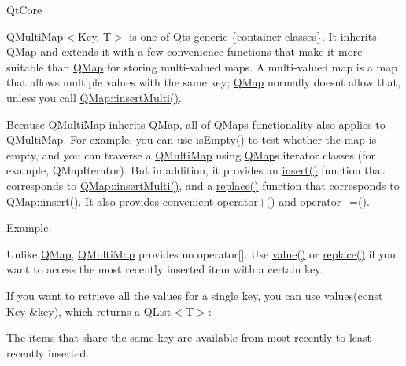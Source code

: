 Qt\+Core

\hyperlink{class_q_multi_map}{Q\+Multi\+Map}$<$Key, T$>$ is one of Qt\textquotesingle{}s generic \{container classes\}. It inherits \hyperlink{class_q_map}{Q\+Map} and extends it with a few convenience functions that make it more suitable than \hyperlink{class_q_map}{Q\+Map} for storing multi-\/valued maps. A multi-\/valued map is a map that allows multiple values with the same key; \hyperlink{class_q_map}{Q\+Map} normally doesn\textquotesingle{}t allow that, unless you call \hyperlink{class_q_map_a075634da2cf912a20dd1c4a5835acfa3}{Q\+Map\+::insert\+Multi()}.

Because \hyperlink{class_q_multi_map}{Q\+Multi\+Map} inherits \hyperlink{class_q_map}{Q\+Map}, all of \hyperlink{class_q_map}{Q\+Map}\textquotesingle{}s functionality also applies to \hyperlink{class_q_multi_map}{Q\+Multi\+Map}. For example, you can use \hyperlink{class_q_map_a33cfb24195273a5e70dcc48644368a99}{is\+Empty()} to test whether the map is empty, and you can traverse a \hyperlink{class_q_multi_map}{Q\+Multi\+Map} using \hyperlink{class_q_map}{Q\+Map}\textquotesingle{}s iterator classes (for example, Q\+Map\+Iterator). But in addition, it provides an \hyperlink{class_q_multi_map_ae067c2f922dd6e13001d93ace23a964a}{insert()} function that corresponds to \hyperlink{class_q_map_a075634da2cf912a20dd1c4a5835acfa3}{Q\+Map\+::insert\+Multi()}, and a \hyperlink{class_q_multi_map_a71c0ddeadd47b9410ef2d64c9fa24d72}{replace()} function that corresponds to \hyperlink{class_q_map_a0cc56ab47ea14af1127ac7399814d289}{Q\+Map\+::insert()}. It also provides convenient \hyperlink{class_q_multi_map_aef448db293ef347dca82cc017c559888}{operator+()} and \hyperlink{class_q_multi_map_aa9c75ef8f14c919a318b494b54422958}{operator+=()}.

Example\+: 
\begin{DoxyCodeInclude}
\end{DoxyCodeInclude}
 Unlike \hyperlink{class_q_map}{Q\+Map}, \hyperlink{class_q_multi_map}{Q\+Multi\+Map} provides no operator\mbox{[}\mbox{]}. Use \hyperlink{class_q_map_ab9c04f61f4abd94439d4431118a238e5}{value()} or \hyperlink{class_q_multi_map_a71c0ddeadd47b9410ef2d64c9fa24d72}{replace()} if you want to access the most recently inserted item with a certain key.

If you want to retrieve all the values for a single key, you can use values(const Key \&key), which returns a Q\+List$<$\+T$>$\+:


\begin{DoxyCodeInclude}
\end{DoxyCodeInclude}
 The items that share the same key are available from most recently to least recently inserted.

